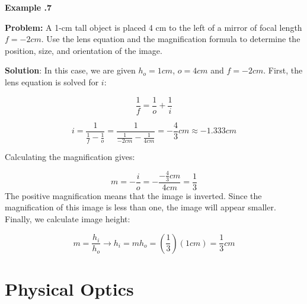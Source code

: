 		\begin{mdframed}[backgroundcolor=blue!10!white]
			\begin{center}	
				\textbf{Example \thesection.7}	
			\end{center}
			
			\textbf{Problem:} A 1-cm tall object is placed 4 cm to the left of a mirror of focal length $f=-2 \si{cm}$.  Use the lens equation and the magnification formula to determine the position, size, and orientation of the image.  
			
			\textbf{Solution}: In this case, we are given $h_o = 1 \si{cm}$, $o = 4 \si{cm}$ and $f = -2 \si{cm}$.  First, the lens equation is solved for $i$:
			
			\begin{equation*}
				\frac{1}{f} = \frac{1}{o} + \frac{1}{i}  
			\end{equation*}
			
			
			\begin{equation*}
				i = \frac{1}{\frac{1}{f}-\frac{1}{o}} = \frac{1}{\frac{1}{-2\si{cm}}-\frac{1}{4\si{cm}}} = \boxed{-\frac{4}{3} \si{cm} \approx -1.333 \si{cm}}
			\end{equation*}
			
			
			Calculating the magnification gives: 
			
			\begin{equation*}
				m = - \frac{i}{o} = -\frac{-\frac{4}{3}\si{cm}}{4\si{cm}} = \boxed{\frac{1}{3}}
			\end{equation*}
			The positive magnification means that the image is inverted.  Since the magnification of this image is less than one, the image will appear smaller.  Finally, we calculate image height:  
			
			\begin{equation*}
				m = \frac{h_i}{h_o} \longrightarrow h_i = m h_o = (\frac{1}{3}) (1 \si{cm}) = \boxed{\frac{1}{3} \si{cm}}
			\end{equation*}
		\end{mdframed}
		
				
				
				
				
				
				
				
				
				
				
				
				
				
		
		
	\section{Physical Optics}
